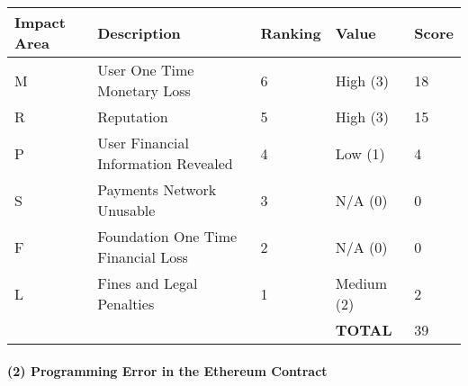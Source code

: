 \documentclass[12pt]{article} %
\begin{document}
{\begin{center}
\begin{tabular}{ | l | l | l | l | l |}
  \hline
  \textbf{Impact Area} & \textbf{Description} & \textbf{Ranking} & \textbf{Value} & \textbf{Score}
  \\ \hline
  M & User One Time Monetary Loss				& 6	& High (3)		& 18
  \\ \hline
  R & Reputation		& 5	& High (3)		& 15
  \\ \hline
  P & User Financial Information Revealed		& 4	& Low (1)		& 4
  \\ \hline
  S & Payments Network Unusable					& 3	& N/A (0)		& 0
  \\ \hline
  F & Foundation One Time Financial Loss	& 2	& N/A (0)		& 0
  \\ \hline
  L & Fines and Legal Penalties						& 1	& Medium (2)	& 2
  \\ \hline
  & & & \textbf{TOTAL} & 39
  \\ \hline
\end{tabular}
\end{center}
\label{tab:severityKeysStolenFromUserDevice}

\paragraph{(2) Programming Error in the Ethereum Contract }

}
\end{document}
